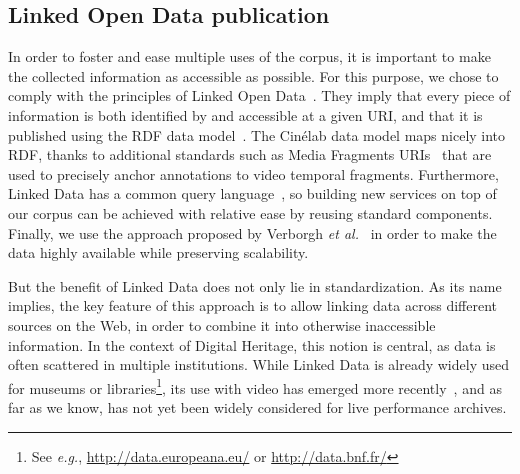 \documentclass[conference]{IEEEtran}
\begin{document}

\subsection{Linked Open Data publication}
In order to foster and ease multiple uses of the corpus,
it is important to make the collected information as accessible as possible.
For this purpose, we chose to comply with the principles of Linked Open Data~\cite{bernerslee2006linkeddata}.
They imply that every piece of information is both identified by and accessible at a given URI, and that it is published using the RDF data model~\cite{cyganiak2014rdf11concepts}.
The Cinélab data model maps nicely into RDF, thanks to additional standards such as Media Fragments URIs~\cite{troncy2012mediafragments} that are used to precisely anchor annotations to video temporal fragments. Furthermore, Linked Data has a common query language~\cite{prudhommeaux2008sparql}, so building new services on top of our corpus can be achieved with relative ease by reusing standard components. Finally, we use the approach proposed by Verborgh \emph{et al.}~\cite{verborgh2014querying} in order to make the data highly available while preserving scalability.

But the benefit of Linked Data does not only lie in standardization.
As its name implies, the key feature of this approach is to allow linking data across different sources on the Web, in order to combine it into otherwise inaccessible information.
In the context of Digital Heritage, this notion is central, as data is often scattered in multiple institutions.
While Linked Data is already widely used for museums or libraries\footnote{
See \emph{e.g.}, \url{http://data.europeana.eu/} or \url{http://data.bnf.fr/}},
its use with video has emerged more recently~\cite{vandeursen2012mediafragmentannotations,steiner2014webvtt},
and as far as we know, has not yet been widely considered for live performance archives.


\end{document}

